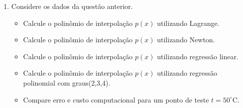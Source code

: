 \begin{enumerate}[label=\thesection.\arabic*]
\item Considere os dados da questão anterior.

\begin{itemize}
    \item Calcule o polinômio de interpolação $p(x)$ utilizando Lagrange.
    \item Calcule o polinômio de interpolação $p(x)$ utilizando Newton.   
    \item Calcule o polinômio de interpolação $p(x)$ utilizando regressão linear.
    \item Calcule o polinômio de interpolação $p(x)$ utilizando regressão polinomial com graus(2,3,4).
    \item Compare erro e custo computacional para um ponto de teste $t=50^{\circ}\mathrm{C}$.
\end{itemize}
	
\end{enumerate}
%
%
%
%
%
%
%
%
